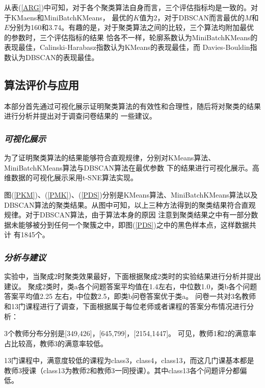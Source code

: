 \documentclass{acm_proc_article-sp}
\begin{document}
从表(\ref{ARG})中可知，对于各个聚类算法自身而言，三个评估指标均是一致的。对于KMaens和MiniBatchKMeans，
最优的$K$值为2，对于DBSCAN而言最优的$M$和$E$分别为160和3.74。有趣的是，对于聚类算法之间的比较，三个算法均附加最优的参数时，三个评估指标的结果
恰各不一样，轮廓系数认为MiniBatchKMeans的表现最佳，Calinski-Harabasz指数认为KMeans的表现最佳，而
Davies-Bouldin指数认为DBSCAN的表现最佳。




\subsection{\textsf{算法评价与应用}}
本部分首先通过可视化展示证明聚类算法的有效性和合理性，随后将对聚类的结果进行分析并提出对于调查问卷结果的
一些建议。

\subsubsection{\textit{可视化展示}}
为了证明聚类算法的结果能够符合直观规律，分别对KMeans算法、MiniBatchKMeans算法与DBSCAN算法在最优参数
下的结果进行可视化展示。高维数据的可视化展示采用t-SNE算法实现。



图(\ref{PKM})、(\ref{PMK})、(\ref{PDS})分别是KMeans算法、MiniBatchKMeans算法以及
DBSCAN算法的聚类结果。从图中可知，以上三种方法得到的聚类结果符合直观规律。对于DBSCAN算法，由于算法本身的原因
注意到聚类结果之中有一部分数据未能够被分到任何一个聚簇之中，即图(\ref{PDS})之中的黑色样本点，这样数据共计
有1845个。

\subsubsection{\textit{分析与建议}}
实验中，当聚成2时聚类效果最好，下面根据聚成2类时的实验结果进行分析并提出建议。
聚成2类时，类a各个问题答案平均值在1.4左右，中位数1.0，类b各个问题答案平均值2.25
左右，中位数2.5，即类b问卷答案优于类a。
问卷一共对3名教师和13门课程进行了调查，下面根据属于每位老师或者课程的答案分布情况进行分析：

3个教师分布分别是[349,426]，[645,799]，[2154,1447]。
可见，教师1和2的满意率占比较高，教师3的满意率较低。

13门课程中，满意度较低的课程为class3，class4，class13，而这几门课基本都是教师3授课（class13为教师2和教师3一同授课）。其中class13各个问题评分都偏低。
\end{document}
